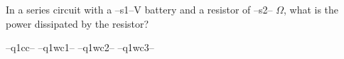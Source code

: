 \question   In a series circuit with a --s1--V battery and a resistor of --s2-- $\Omega$, what is the power dissipated by the resistor?

\begin{randomizechoices}
\correctchoice --q1cc-- 
\choice --q1wc1--  
\choice --q1wc2-- 
\choice --q1wc3-- 
\end{randomizechoices}

